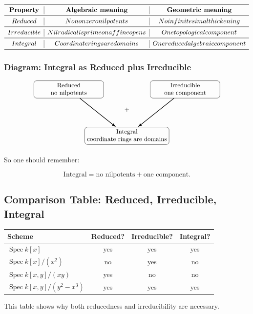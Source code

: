 \documentclass[12pt,a4paper]{article}
\DeclareMathOperator{\Spec}{Spec}
\providecommand{\Spec}{\operatorname{Spec}}
\theoremstyle{notespace}
\begin{document}
\[
\begin{array}{c|c|c}
	\toprule
	\textbf{Property} & \textbf{Algebraic meaning} & \textbf{Geometric meaning} \\
	\midrule
	Reduced
	&
	No nonzero nilpotents
	&
	No infinitesimal thickening
	\\
	\midrule
	Irreducible
	&
	Nilradical is prime on affine opens
	&
	One topological component
	\\
	\midrule
	Integral
	&
	Coordinate rings are domains
	&
	One reduced algebraic component
	\\
	\bottomrule
\end{array}
\]

\subsubsection*{Diagram: Integral as Reduced plus Irreducible}

\[
\begin{tikzpicture}[
	every node/.style={font=\small},
	box/.style={draw, rounded corners, minimum width=3.6cm, minimum height=0.9cm, align=center},
	arrow/.style={-{Latex[length=2mm]}, thick}
	]
	
	\node[box] (R) at (-3,1.3) {Reduced\\ no nilpotents};
	\node[box] (Irr) at (3,1.3) {Irreducible\\ one component};
	\node[box] (Int) at (0,-1.1) {Integral\\ coordinate rings are domains};
	
	\draw[arrow] (R) -- (Int);
	\draw[arrow] (Irr) -- (Int);
	
	\node at (0,0.25) {\(+\)};
	
\end{tikzpicture}
\]

So one should remember:

\[
\boxed{
	\text{Integral}=
	\text{no nilpotents}
	+
	\text{one component}.
}
\]

\subsection{Comparison Table: Reduced, Irreducible, Integral}

\begin{center}
	\renewcommand{\arraystretch}{1.15}
	\setlength{\tabcolsep}{6pt}
	
	\begin{tabular}{lccc}
		\toprule
		\textbf{Scheme} & \textbf{Reduced?} & \textbf{Irreducible?} & \textbf{Integral?} \\
		\midrule
		\(\Spec k[x]\) & yes & yes & yes \\
		\(\Spec k[x]/(x^2)\) & no & yes & no \\
		\(\Spec k[x,y]/(xy)\) & yes & no & no \\
		\(\Spec k[x,y]/(y^2-x^3)\) & yes & yes & yes \\
		\bottomrule
	\end{tabular}
\end{center}
This table shows why both reducedness and irreducibility are necessary.
\end{document}
